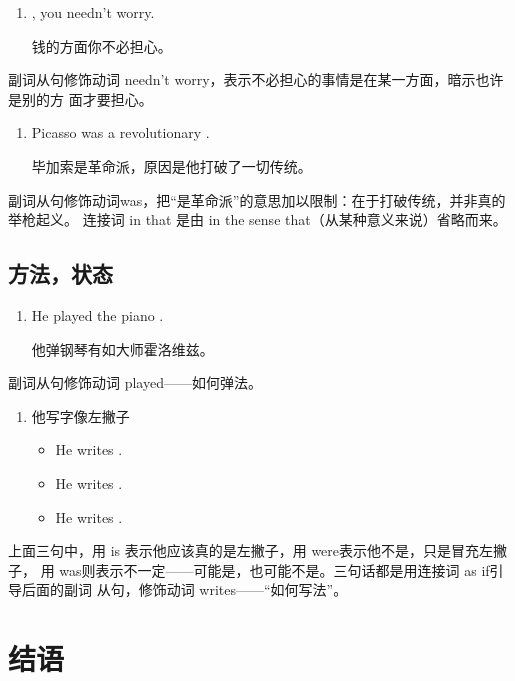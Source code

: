\begin{enumerate}
\item {} , you needn't
  worry.

  钱的方面你不必担心。
\end{enumerate}
副词从句修饰动词 needn't worry，表示不必担心的事情是在某一方面，暗示也许是别的方
面才要担心。

\begin{enumerate}[resume]
\item Picasso was a revolutionary  .

  毕加索是革命派，原因是他打破了一切传统。
\end{enumerate}
副词从句修饰动词was，把“是革命派”的意思加以限制：在于打破传统，并非真的举枪起义。
连接词 in that 是由 in the sense that（从某种意义来说）省略而来。

\subsection{方法，状态}

\begin{enumerate}
\item He played the piano  .

  他弹钢琴有如大师霍洛维兹。
\end{enumerate}
副词从句修饰动词 played——如何弹法。

\begin{enumerate}[resume]
\item 他写字像左撇子
  \begin{itemize}
  \item He writes   .
  \item He writes   .
  \item He writes   .
  \end{itemize}
\end{enumerate}

上面三句中，用 is 表示他应该真的是左撇子，用 were表示他不是，只是冒充左撇子，
用 was则表示不一定——可能是，也可能不是。三句话都是用连接词 as if引导后面的副词
从句，修饰动词 writes——“如何写法”。

\section{结语}


